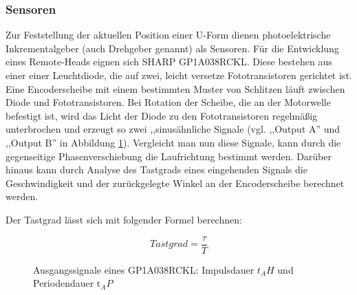 \documentclass[a4paper, 12pt, bibtotocnumbered, liststotocnumbered]{scrartcl}
\begin{document}
	\subsubsection{Sensoren}
	Zur Feststellung der aktuellen Position einer U-Form dienen photoelektrische Inkrementalgeber (auch Drehgeber genannt) als Sensoren. Für die Entwicklung eines Remote-Heads eignen sich SHARP GP1A038RCKL\cite{inkrementalgeber}. Diese bestehen aus einer einer Leuchtdiode, die auf zwei, leicht versetze Fototransistoren gerichtet ist. Eine Encoderscheibe mit einem bestimmten Muster von Schlitzen läuft zwischen Diode und Fototransistoren. Bei Rotation der Scheibe, die an der Motorwelle befestigt ist, wird das Licht der Diode zu den Fototransistoren regelmäßig unterbrochen und erzeugt so zwei ,,sinusähnliche Signale\cite{wikipedia-inkrementalgeber} (vgl. ,,Output A'' und ,,Output B'' in Abbildung \ref{GP1A038RCKL-AOutBOut}). Vergleicht man nun diese Signale, kann durch die gegenseitige Phasenverschiebung die Laufrichtung bestimmt werden. Darüber hinaus kann durch Analyse des Tastgrads\cite{wikipedia-tastgrad} eines eingehenden Signals die Geschwindigkeit und der zurückgelegte Winkel an der Encoderscheibe berechnet werden.

	Der Tastgrad lässt sich mit folgender Formel berechnen:

	\begin{equation}
		Tastgrad = \frac{\tau}{T}
	\end{equation}

	\begin{figure}[htb]
		\centering
		\hfill
		\caption[Quelle: hhh]{Ausgangssignale eines GP1A038RCKL: Impulsdauer $\text{}t_AH$ und Periodendauer $\text{t}_AP$}
		\label{GP1A038RCKL-AOutBOut}
	\end{figure}
\end{document}
